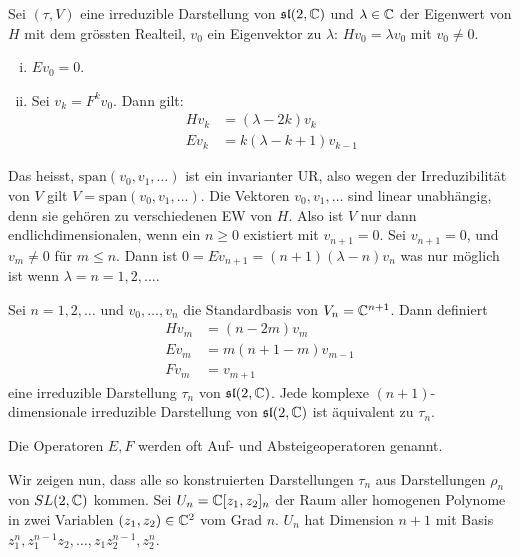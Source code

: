 Sei $(\tau,V)$ eine irreduzible Darstellung von $\mathfrak{sl}(2,\mathbb{C})$ und $\lambda \in \mathbb{C}$
der Eigenwert von $H$ mit dem grössten Realteil, $v_0$ ein Eigenvektor zu
$\lambda$: $H v_0 = \lambda v_0$ mit $v_0 \neq 0$.

\begin{lemma}
    \begin{enumerate}[(i)]
        \item $E v_0 = 0$.
        \item Sei $v_k = F^k v_0$. Dann gilt:
            \begin{align*}
                H v_k &= (\lambda - 2k) v_k
                \\
                E v_k &= k (\lambda - k + 1) v_{k-1}
            \end{align*}
    \end{enumerate}
\end{lemma}

Das heisst, $\text{span} (v_0,v_1,\dots)$ ist ein invarianter UR, also wegen
der Irreduzibilität von $V$ gilt $V = \text{span} (v_0,v_1,\dots)$. Die
Vektoren $v_0,v_1,\dots$ sind linear unabhängig, denn sie gehören zu
verschiedenen EW von $H$. Also ist $V$ nur dann endlichdimensionalen, wenn ein
$n \geq 0$ existiert mit $v_{n+1} = 0$. Sei $v_{n+1} =0$, und $v_m \neq 0$
für $m \leq n$. Dann ist $0 = E v_{n+1} = (n+1)(\lambda-n)v_n$ was nur
möglich ist wenn $\lambda = n = 1,2,\dots$.

\begin{satz}
    Sei $n=1,2,\dots$ und $v_0,\dots,v_n$ die Standardbasis von $V_n = \mathbb{C}^{n+1}$.
    Dann definiert
    \begin{align*}
        H v_m &= (n-2m) v_m \\
        E v_m &= m(n+1-m) v_{m-1} \\
        F v_m &= v_{m+1}
    \end{align*}
    eine irreduzible Darstellung $\tau_n$ von $\mathfrak{sl}(2,\mathbb{C})$. Jede komplexe
    $(n+1)$-dimensionale irreduzible Darstellung von $\mathfrak{sl}(2,\mathbb{C})$ ist
    äquivalent zu $\tau_n$.
\end{satz}

\begin{bemerkung}
    Die Operatoren $E,F$ werden oft Auf- und Absteigeoperatoren genannt.
\end{bemerkung}

Wir zeigen nun, dass alle so konstruierten Darstellungen $\tau_n$ aus
Darstellungen $\rho_n$ von $SL(2,\mathbb{C})$ kommen. Sei $U_n = \mathbb{C} [z_1,z_2]_n$ der
Raum aller homogenen Polynome in zwei Variablen $(z_1,z_2) \in \mathbb{C}^2$ vom
Grad $n$. $U_n$ hat Dimension $n+1$ mit Basis $z_1^n,z_1^{n-1} z_2 ,\dots,
z_1 z_2^{n-1} , z_2^n$.

